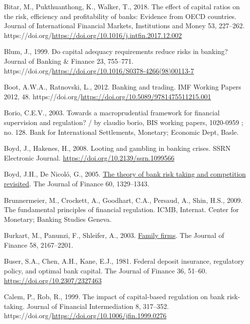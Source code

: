 \documentclass[
  letterpaper,
  DIV=11,
  numbers=noendperiod]{scrreprt}
\newlength{\cslhangindent}
\newenvironment{CSLReferences}[2] %
 {\begin{list}{}{%
  \setlength{\itemindent}{0pt}
  \setlength{\leftmargin}{0pt}
  \setlength{\parsep}{0pt}
  \ifodd #1
   \setlength{\leftmargin}{\cslhangindent}
   \setlength{\itemindent}{-1\cslhangindent}
  \fi
  \setlength{\itemsep}{#2\baselineskip}}}
 {\end{list}}
\begin{document}
\begin{CSLReferences}{1}{0}
Bitar, M., Pukthuanthong, K., Walker, T., 2018. The effect of capital
ratios on the risk, efficiency and profitability of banks: Evidence from
OECD countries. Journal of International Financial Markets, Institutions
and Money 53, 227--262.
https://doi.org/\url{https://doi.org/10.1016/j.intfin.2017.12.002}

Blum, J., 1999. Do capital adequacy requirements reduce risks in
banking? Journal of Banking \& Finance 23, 755--771.
https://doi.org/\url{https://doi.org/10.1016/S0378-4266(98)00113-7}

Boot, A.W.A., Ratnovski, L., 2012. Banking and trading. IMF Working
Papers 2012, 48.
https://doi.org/\url{https://doi.org/10.5089/9781475511215.001}

Borio, C.E.V., 2003. Towards a macroprudential framework for financial
supervision and regulation? / by claudio borio, BIS working papers,
1020-0959 ; no. 128. Bank for International Settlements, Monetary;
Economic Dept, Basle.

Boyd, J., Hakenes, H., 2008. Looting and gambling in banking crises.
SSRN Electronic Journal. \url{https://doi.org/10.2139/ssrn.1099566}

Boyd, J.H., De Nicoló, G., 2005.
\href{http://www.jstor.org.queens.ezp1.qub.ac.uk/stable/3694928}{The
theory of bank risk taking and competition revisited}. The Journal of
Finance 60, 1329--1343.

Brunnermeier, M., Crockett, A., Goodhart, C.A., Persaud, A., Shin, H.S.,
2009. The fundamental principles of financial regulation. ICMB,
Internat. Center for Monetary; Banking Studies Geneva.

Burkart, M., Panunzi, F., Shleifer, A., 2003.
\href{http://www.jstor.org/stable/3648187}{Family firms}. The Journal of
Finance 58, 2167--2201.

Buser, S.A., Chen, A.H., Kane, E.J., 1981. Federal deposit insurance,
regulatory policy, and optimal bank capital. The Journal of Finance 36,
51--60. \url{https://doi.org/10.2307/2327463}

Calem, P., Rob, R., 1999. The impact of capital-based regulation on bank
risk-taking. Journal of Financial Intermediation 8, 317--352.
https://doi.org/\url{https://doi.org/10.1006/jfin.1999.0276}


\end{CSLReferences}
\end{document}
